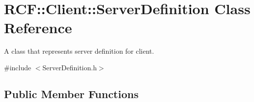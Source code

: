 \hypertarget{class_r_c_f_1_1_client_1_1_server_definition}{}\section{R\+C\+F\+:\+:Client\+:\+:Server\+Definition Class Reference}
\label{class_r_c_f_1_1_client_1_1_server_definition}


A class that represents server definition for client.  




{\ttfamily \#include $<$Server\+Definition.\+h$>$}

\subsection*{Public Member Functions}

